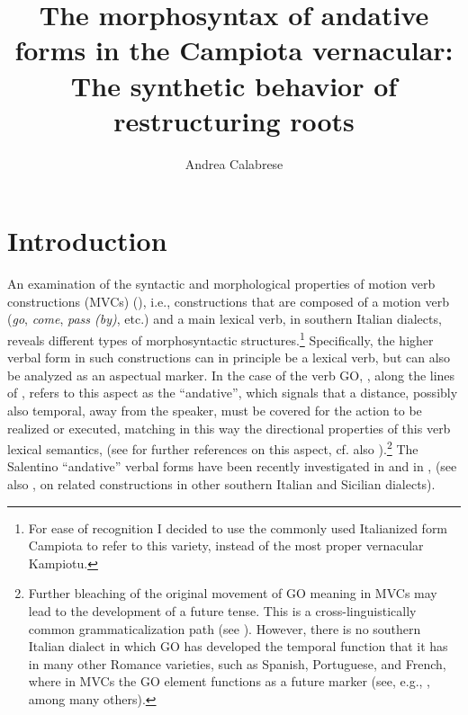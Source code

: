 \documentclass[output=paper]{langscibook}
\author{Andrea Calabrese\affiliation{University of Connecticut}}
\title[The morphosyntax of andative forms in the Campiota vernacular]
      {The morphosyntax of andative forms in the Campiota vernacular: The synthetic behavior of restructuring roots}
\begin{document}
\maketitle

\section{Introduction}


An examination of the syntactic and morphological properties of motion verb constructions (MVCs) (\citealt{cruschina2013a, cruschina2021a}), i.e., constructions that are composed of a motion verb (\textit{go}, \textit{come}, \textit{pass (by)}, etc.) and a main lexical verb, in southern Italian dialects, reveals different types of morphosyntactic structures.\footnote{For ease of recognition I decided to use the commonly used Italianized form Campiota to refer to this variety, instead of the most proper vernacular Kampiotu.} Specifically, the higher verbal form in such constructions can in principle be a lexical verb, but can also be analyzed as an aspectual marker. In the case of the verb GO, \citet{cruschina2013a}, along the lines of \citet{Cinque1999, Cinque2006}, refers to this aspect as the “andative”, which signals that a distance, possibly also temporal, away from the speaker, must be covered for the action to be realized or executed, matching in this way the directional properties of this verb lexical semantics, (see \cite{cinque2006a} for further references on this aspect, cf. also \cite{heine2018a}).\footnote{Further bleaching of the original movement of GO meaning in MVCs  may lead to the development of a future tense. This is a cross-linguistically common grammaticalization path (see \cite{bybee1994a}). However, there is no southern Italian dialect in which GO has developed the temporal function that it has in many other Romance varieties, such as Spanish, Portuguese, and French, where in MVCs the GO element functions as a future marker (see, e.g., \cite{squartini1998a}, among many others).}   The Salentino “andative” verbal forms have been recently investigated in \cite{ledgeway2016a} and in \cite{manzini2017a}, \cite{cardinaletti2019a} (see also \cite{andriani2017a, cardinaletti2001a, cardinaletti2003a, cruschina2013a, cruschina2021a}, \cite{caro2015a, caro2018a, caro2019a, caro2015b, manzini2005a} on related constructions in other southern Italian and Sicilian dialects). 
\end{document}
